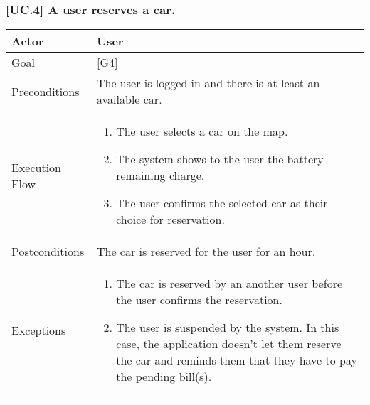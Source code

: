 \documentclass[english]{article}
\begin{document}
	\subsubsection{[UC.4] A user reserves a car.}
	\begin{tabularx}{\textwidth}{  l  X  }
		\hline
		Actor & User\\
		\hline
		Goal & [G4]\\
		\hline
		Preconditions & The user is logged in and there is at least an available car.\\
		\hline
		Execution Flow & \begin{enumerate}
			\item{The user selects a car on the map.}
			\item{The system shows to the user the battery remaining charge.}
			\item{The user confirms the selected car as their choice for reservation.}
		\end{enumerate}\\
		\hline
		Postconditions & The car is reserved for the user for an hour. \\
		\hline
		Exceptions & \begin{enumerate}
			\item{The car is reserved by an another user before the user confirms the reservation.}
			\item{The user is suspended by the system. In this case, the application doesn't let them reserve the car and reminds them that they have to pay the pending bill(s).}
		\end{enumerate}\\
		\hline
	\end{tabularx}
\end{document}

